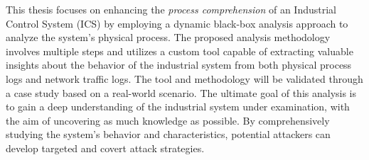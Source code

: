 \newenvironment{abstract}%
{\cleardoublepage\fncyblank\null\vfill\begin{center}%
		\bfseries\Large\abstractname\end{center}}%
{\vfill\null}

\begin{titlepage}
	\begin{abstract}
		This thesis focuses on enhancing the \textit{process comprehension} of an Industrial Control System (ICS) by employing a dynamic black-box analysis approach to analyze the system's physical process. The proposed analysis methodology involves multiple steps and utilizes a custom tool capable of extracting valuable insights about the behavior of the industrial system from both physical process logs and network traffic logs. The tool and methodology will be validated through a case study based on a real-world scenario.\newline
		The ultimate goal of this analysis is to gain a deep understanding of the industrial system under examination, with the aim of uncovering as much knowledge as possible. By comprehensively studying the system's behavior and characteristics, potential attackers can develop targeted and covert attack strategies.
	\end{abstract}
	\vfill
\end{titlepage}
\thispagestyle{empty}